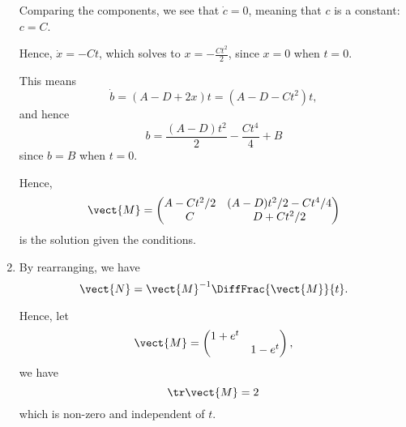 \begin{enumerate}
          Comparing the components, we see that \(\dot{c} = 0\), meaning that \(c\) is a constant: \(c = C\).

          Hence, \(\dot{x} = -Ct\), which solves to \(x = -\frac{Ct^2}{2}\), since \(x = 0\) when \(t = 0\).

          This means
          \[
              \dot{b} = (A - D + 2x) t = (A - D - Ct^2)t,
          \]
          and hence
          \[
              b = \frac{(A - D) t^2}{2} - \frac{Ct^4}{4} + B
          \]
          since \(b = B\) when \(t = 0\).

          Hence,
          \[
              \vect{M} = \begin{pmatrix}
                  A - Ct^2 / 2 & (A - D) t^2 / 2 - Ct^4 / 4 \\
                  C            & D + Ct^2 / 2
              \end{pmatrix}
          \]
          is the solution given the conditions.

    \item By rearranging, we have
          \[
              \vect{N} = \vect{M}^{-1} \DiffFrac{\vect{M}}{t}.
          \]

          Hence, let
          \[
              \vect{M} = \begin{pmatrix}
                  1 + e^t & \\ & 1 - e^t
              \end{pmatrix},
          \]
          we have
          \[
              \tr \vect{M} = 2
          \]
          which is non-zero and independent of \(t\).


\end{enumerate}
